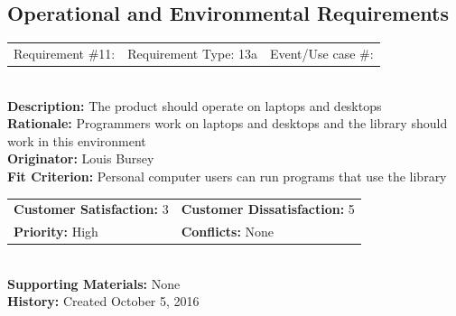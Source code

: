 \documentclass[12pt, titlepage]{article}
\begin{document}
\subsection{Operational and Environmental Requirements}

%
%
\begin{reqbox}
\begin{tabular}{ccc}
Requirement \#11: & Requirement Type: 13a & Event/Use case \#: \\
\end{tabular} \\
\textbf{Description:} The product should operate on laptops and desktops \\
\textbf{Rationale:} Programmers work on laptops and desktops and the library should work in this environment \\
\textbf{Originator:} Louis Bursey\\
\textbf{Fit Criterion:}  Personal computer users can run programs that use the library\\
\begin{tabular}{ll}
\textbf{Customer Satisfaction:} 3 & \textbf{Customer Dissatisfaction:} 5 \\
\textbf{Priority:} High & \textbf{Conflicts:} None\\
\end{tabular} \\
\textbf{Supporting Materials:} None \\
\textbf{History:} Created October 5, 2016
\end{reqbox}
\end{document}
